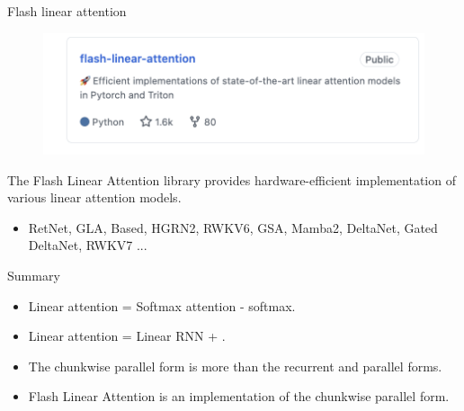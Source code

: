 \begin{frame}{Flash linear attention}
    \begin{figure}
        \centering
        \includegraphics[width=.9\linewidth]{figure/fla-repo.png}
    \end{figure}
    The Flash Linear Attention library provides hardware-efficient implementation of various linear attention models.
    \begin{itemize}
        \item RetNet, GLA, Based, HGRN2, RWKV6, GSA, Mamba2, DeltaNet, Gated DeltaNet, RWKV7  ...
    \end{itemize}
\end{frame}

\begin{frame}{Summary}
    \begin{itemize}
        \item Linear attention = Softmax attention - softmax.
        \item Linear attention = Linear RNN + {\color{red}{matrix-valued hidden state}}.
        \item The chunkwise parallel form is more {\color{red}{hardware-friendly}} than the recurrent and parallel forms.
        \item Flash Linear Attention is an {\color{red}{I/O-aware}} implementation of the chunkwise parallel form.
    \end{itemize}
\end{frame}